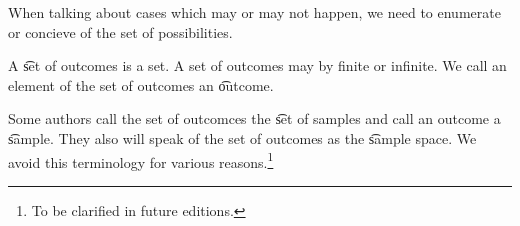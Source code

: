 

When talking about cases which
may or may not happen, we need
to enumerate or concieve of the
set of possibilities.


A \t{set of outcomes} is a set.
A set of outcomes may by finite or infinite.
We call an element of the set of outcomes an \t{outcome}.

Some authors call the set of outcomces the \t{set of samples} and call an outcome a \t{sample}.
They also will speak of the set of outcomes as the \t{sample space}.
We avoid this terminology for various reasons.\footnote{To be clarified in future editions. }

\blankpage
